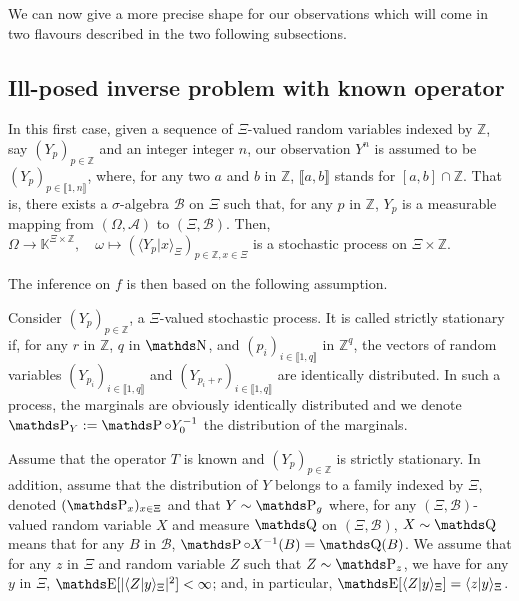 We can now give a more precise shape for our observations which will come in two flavours described in the two following subsections.


\subsection{Ill-posed inverse problem with known operator}\label{INTRO_DATA_KNOWN}
In this first case, given a sequence of $\Xi$-valued random variables indexed by $\mathds{Z}$, say $(Y_{p})_{p \in \mathds{Z}}$ and an integer integer $n$, our observation $Y^{n}$ is assumed to be $(Y_{p})_{p \in \llbracket 1, n \rrbracket}$, where, for any two $a$ and $b$ in $\mathds{Z}$, $\llbracket a, b \rrbracket$ stands for $[a, b] \cap \mathds{Z}$.
That is, there exists a $\sigma$-algebra $\mathcal{B}$ on $\Xi$ such that, for any $p$ in $\mathds{Z}$, $Y_{p}$ is a measurable mapping from $(\Omega, \mathcal{A})$ to $(\Xi, \mathcal{B})$.
Then, $\Omega \rightarrow \mathds{K}^{\Xi \times \mathds{Z}}, \quad \omega \mapsto (\langle Y_{p} \vert x \rangle_{\Xi})_{p \in \mathds{Z}, x \in \Xi}$ is a stochastic process on $\Xi \times \mathds{Z}$.

The inference on $f$ is then based on the following assumption.

\begin{de}
Consider $(Y_{p})_{p \in \mathds{Z}}$, a $\Xi$-valued stochastic process.
It is called strictly stationary if, for any $r$ in $\mathds{Z}$, $q$ in $\N$, and $(p_{i})_{i \in \llbracket 1, q \rrbracket}$ in $\mathds{Z}^{q}$, the vectors of random variables $(Y_{p_{i}})_{i \in \llbracket 1, q \rrbracket}$ and $(Y_{p_{i} + r})_{i \in \llbracket 1, q \rrbracket}$ are identically distributed.
In such a process, the marginals are obviously identically distributed and we denote $\P_{Y} := \P \circ Y_{0}^{-1}$ the distribution of the marginals.
\assEnd
\end{de}

\begin{as}\label{AS_INTRO_DATA_KNOWN}
Assume that the operator $T$ is known and $(Y_{p})_{p \in \mathds{Z}}$ is strictly stationary.
In addition, assume that the distribution of $Y$ belongs to a family indexed by $\Xi$, denoted $(\P_{x})_{x \in \Xi}$ and that $Y \sim \P_{g}$ where, for any $(\Xi, \mathcal{B})$-valued random variable $X$ and measure $\Q$ on $(\Xi, \mathcal{B})$, $X \sim \Q$ means that for any $B$ in $\mathcal{B}$, $\P \circ X^{-1}(B) = \Q(B)$.
We assume that for any $z$ in $\Xi$ and random variable $Z$ such that $Z \sim \P_{z}$, we have for any $y$ in $\Xi$, $\E[\vert \langle Z \vert y \rangle_{\Xi} \vert^{2}] < \infty$; and, in particular, $\E[ \langle Z \vert y \rangle_{\Xi} ] = \langle z \vert y \rangle_{\Xi}$.
\assEnd
\end{as}

